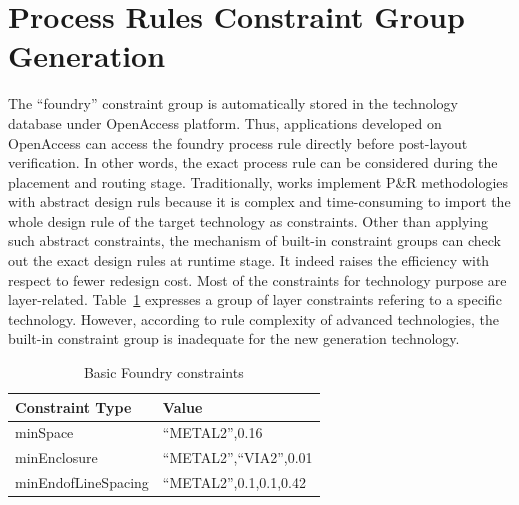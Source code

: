   \section{Process Rules Constraint Group Generation}\label{sec:RCG}
  The ``foundry'' constraint group is automatically stored in the technology database under OpenAccess platform. Thus, applications developed on OpenAccess can access the foundry process rule directly before post-layout verification. In other words, the exact process rule can be considered during the placement and routing stage. Traditionally, works implement P\&R methodologies with abstract design ruls because it is complex and time-consuming to import the whole design rule of the target technology as constraints. Other than applying such abstract constraints, the mechanism of built-in constraint groups can check out the exact design rules at runtime stage. It indeed raises the efficiency with respect to fewer redesign cost. Most of the constraints for technology purpose are layer-related. Table~\ref{tableFoundryCon} expresses a group of layer constraints refering to a specific technology. However, according to rule complexity of advanced technologies, the built-in constraint group is inadequate for the new generation technology. 
  
  \begin{table}[ht]
    \centering
    \caption{Basic Foundry constraints}\label{tableFoundryCon}
    \begin{scriptsize}
      \begin{tabular}[t]{|l|l|}
        \hline
        Constraint Type & Value \\
        \hline
        minSpace  & ``METAL2'',0.16 \\
        \hline
        minEnclosure  & ``METAL2'',``VIA2'',0.01  \\
        \hline
        minEndofLineSpacing & ``METAL2'',0.1,0.1,0.42 \\
        \hline
      \end{tabular}
    \end{scriptsize}
  \end{table}
  

